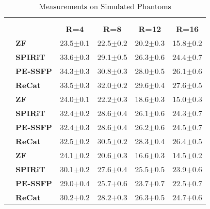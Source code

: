 \documentclass[11pt, onecolumn]{article}
\newcommand{\mwidth}{0.6\columnwidth}
\newcommand{\T}{\rule{0pt}{2.6ex}}
\begin{document}
\begin{table}[t]
	
	\centering
	\footnotesize
	\setlength{\tabcolsep}{4pt}
	\caption{Measurements on Simulated Phantoms}
	\label{tab:phantom} %
	\begin{threeparttable}
		\begin{tabular*}{\mwidth}{@{\extracolsep{\fill}}l|l|cccc} %
			\multicolumn{6}{c}{\textbf{}} \\[.5ex]
			\hline 
			\multicolumn{2}{c|}{\textbf{}} \T & \textbf{R=4} & \textbf{R=8} & \textbf{R=12} & \textbf{R=16}\\ 
			\hline \hline \T 
			
			\multirow{4}{*}{\textbf{N=8}}
			& {\textbf{ZF}}  \T & 23.5$\pm$0.1 & 22.5$\pm$0.2 & 20.2$\pm$0.3 & 15.8$\pm$0.2\\ 
			\cline{2-6}
			& {\textbf{SPIRiT}} \T & 33.6$\pm$0.3 & 29.1$\pm$0.5 & 26.3$\pm$0.6 & 24.4$\pm$0.7\\ 
			\cline{2-6}
			& {\textbf{PE-SSFP}} \T & 34.3$\pm$0.3 & 30.8$\pm$0.3 & 28.0$\pm$0.5 & 26.1$\pm$0.6\\ 
			\cline{2-6}
			& {\textbf{ReCat}} \T & 33.5$\pm$0.3 & 32.0$\pm$0.2 & 29.6$\pm$0.4 & 27.6$\pm$0.5\\ 
			\hline \hline \T
			
			\multirow{4}{*}{\textbf{N=4}}
			& {\textbf{ZF}} \T & 24.0$\pm$0.1 & 22.2$\pm$0.3 & 18.6$\pm$0.3 & 15.0$\pm$0.3\\ 
			\cline{2-6}
			& {\textbf{SPIRiT}} \T & 32.4$\pm$0.2 & 28.6$\pm$0.4 & 26.1$\pm$0.6 & 24.3$\pm$0.7\\ 
			\cline{2-6}
			& {\textbf{PE-SSFP}} \T & 32.4$\pm$0.3 & 28.6$\pm$0.4 & 26.2$\pm$0.6 & 24.5$\pm$0.7\\ 
			\cline{2-6}
			& {\textbf{ReCat}} \T & 32.5$\pm$0.2 & 30.5$\pm$0.2 & 28.3$\pm$0.4 & 26.4$\pm$0.5\\ 
			\hline \hline \T
			
			\multirow{4}{*}{\textbf{N=2}}
			& {\textbf{ZF}} \T & 24.1$\pm$0.2 & 20.6$\pm$0.3 & 16.6$\pm$0.3 & 14.5$\pm$0.2\\ 
			\cline{2-6}
			& {\textbf{SPIRiT}} \T & 30.1$\pm$0.2 & 27.6$\pm$0.4 & 25.5$\pm$0.5 & 23.9$\pm$0.6\\ 
			\cline{2-6}
			& {\textbf{PE-SSFP}} \T & 29.0$\pm$0.4 & 25.7$\pm$0.6 & 23.7$\pm$0.7 & 22.5$\pm$0.7\\ 
			\cline{2-6}
			& {\textbf{ReCat}} \T & 30.2$\pm$0.2 & 28.2$\pm$0.3 & 26.3$\pm$0.5 & 24.7$\pm$0.6\\ 
			\hline
			

\end{tabular*}
\end{threeparttable}
\end{table}
\end{document}
